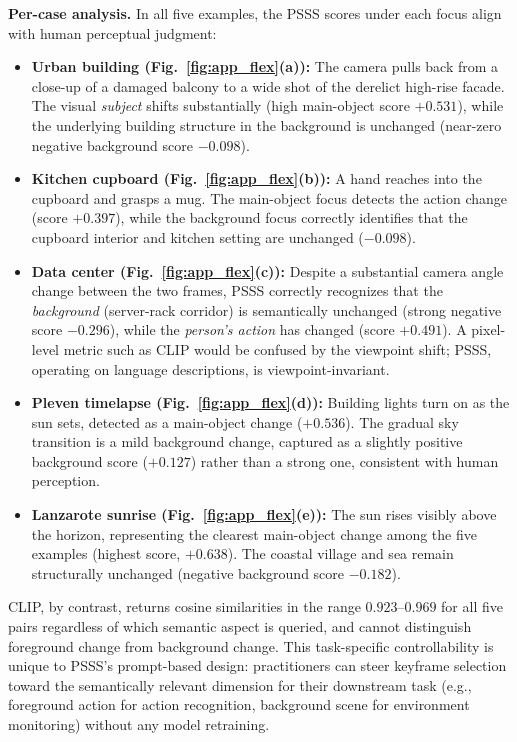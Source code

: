 \documentclass[10pt,journal]{IEEEtran}
\begin{document}
\textbf{Per-case analysis.}
In all five examples, the PSSS scores under each focus align with human perceptual judgment:
\begin{itemize}
  \item \textbf{Urban building (Fig.~\ref{fig:app_flex}(a)):} The camera pulls back from a close-up of a damaged balcony to a wide shot of the derelict high-rise facade. The visual \emph{subject} shifts substantially (high main-object score $+0.531$), while the underlying building structure in the background is unchanged (near-zero negative background score $-0.098$).

  \item \textbf{Kitchen cupboard (Fig.~\ref{fig:app_flex}(b)):} A hand reaches into the cupboard and grasps a mug. The main-object focus detects the action change (score $+0.397$), while the background focus correctly identifies that the cupboard interior and kitchen setting are unchanged ($-0.098$).

  \item \textbf{Data center (Fig.~\ref{fig:app_flex}(c)):} Despite a substantial camera angle change between the two frames, PSSS correctly recognizes that the \emph{background} (server-rack corridor) is semantically unchanged (strong negative score $-0.296$), while the \emph{person's action} has changed (score $+0.491$). A pixel-level metric such as CLIP would be confused by the viewpoint shift; PSSS, operating on language descriptions, is viewpoint-invariant.

  \item \textbf{Pleven timelapse (Fig.~\ref{fig:app_flex}(d)):} Building lights turn on as the sun sets, detected as a main-object change ($+0.536$). The gradual sky transition is a mild background change, captured as a slightly positive background score ($+0.127$) rather than a strong one, consistent with human perception.

  \item \textbf{Lanzarote sunrise (Fig.~\ref{fig:app_flex}(e)):} The sun rises visibly above the horizon, representing the clearest main-object change among the five examples (highest score, $+0.638$). The coastal village and sea remain structurally unchanged (negative background score $-0.182$).
\end{itemize}
CLIP, by contrast, returns cosine similarities in the range $0.923$--$0.969$ for all five pairs regardless of which semantic aspect is queried, and cannot distinguish foreground change from background change. This task-specific controllability is unique to PSSS's prompt-based design: practitioners can steer keyframe selection toward the semantically relevant dimension for their downstream task (e.g., foreground action for action recognition, background scene for environment monitoring) without any model retraining.
\end{document}
